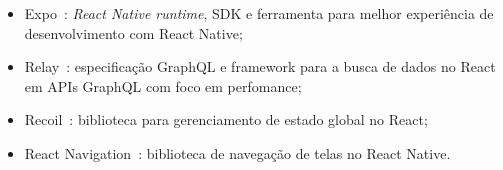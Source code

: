 \begin{itemize}
	\item Expo~\cite{expo}: \emph{React Native runtime}, SDK e ferramenta para melhor experiência de desenvolvimento com React Native;
	\item Relay~\cite{relay}: especificação GraphQL e framework para a busca de dados no React em APIs GraphQL com foco em perfomance;
	\item Recoil~\cite{recoil}: biblioteca para gerenciamento de estado global no React;
	\item React Navigation~\cite{react-navigation}: biblioteca de navegação de telas no React Native.
\end{itemize}






